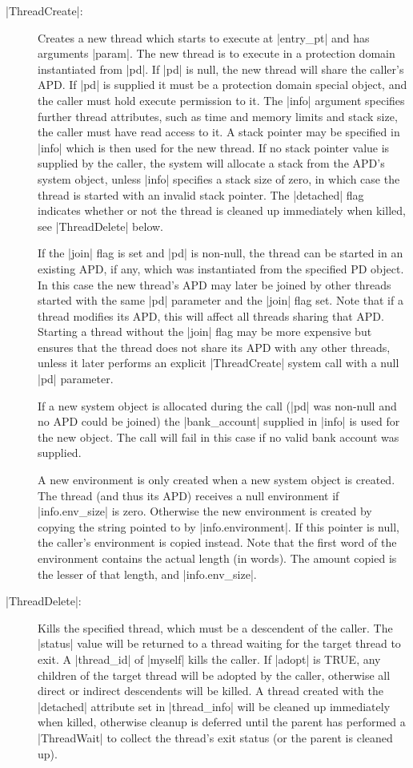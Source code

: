 \documentclass[a4paper,11pt,twoside,dvips]{report}
\begin{document}
\begin{description}
\item[|ThreadCreate|:] Creates a new thread which starts to execute at
|entry\_pt| and has arguments |param|. The new thread is to
execute in a protection domain instantiated from |pd|. If |pd| is null,
the new thread will share the caller's APD. If |pd| is supplied it must
be a protection domain special object, and the caller must hold execute
permission to it. The |info| argument specifies further thread
attributes, such as time and memory limits and stack size, the caller
must have read access to it. A stack
pointer may be specified in |info| which is then used for the new
thread. If no stack pointer value is supplied by the caller, the system
will allocate a stack from the APD's system object, unless |info|
specifies a stack size of zero, in which case the thread is started with
an invalid stack pointer.  The |detached| flag indicates whether or not
the thread is cleaned up immediately when killed, see |ThreadDelete|
below.

If the |join| flag is set and |pd| is non-null, the thread can be
started in an existing APD, if any, which was instantiated from the
specified PD object. In this case the new thread's APD may later be
joined by other threads started with the same |pd| parameter and the
|join| flag set. Note that if a thread modifies its APD, this will
affect all threads sharing that APD. Starting a thread without the
|join| flag may be more expensive but ensures that the thread does not
share its APD with any other threads, unless it later performs an
explicit |ThreadCreate| system call with a null |pd| parameter.

If a new system object is allocated during the call (|pd| was non-null
and no APD could be joined) the |bank\_account| supplied in |info| is
used for the new object. The call will fail in this case if no valid
bank account was supplied.

A new environment is only created when a new system object is
created. The thread (and thus its APD) receives a null environment if
|info.env\_size| is zero. Otherwise the new environment is created
by copying the string pointed to by |info.environment|. If this
pointer is null, the caller's environment is copied instead. Note that
the first word of the environment contains the actual length (in
words). The amount copied is the lesser of that length, and
|info.env\_size|.

\item[|ThreadDelete|:] Kills the specified thread, which must
be a descendent of the caller. The |status| value will be
returned to a thread waiting for the target thread to exit. A
|thread\_id| of |myself| kills the caller. If |adopt| is TRUE,
any children of the target thread will be adopted by the caller,
otherwise all direct or indirect descendents will be killed. A thread
created with the |detached| attribute set in |thread\_info| will be
cleaned up immediately when killed, otherwise cleanup is deferred until
the parent has performed a |ThreadWait| to collect the thread's exit
status (or the parent is cleaned up).


\end{description}
\end{document}
